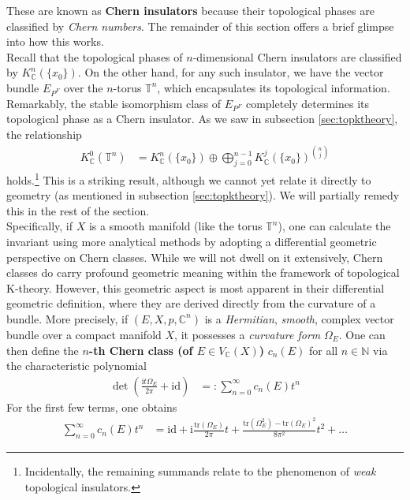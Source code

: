These are known as \textbf{Chern insulators} because their topological phases are classified by \textit{Chern numbers}.
The remainder of this section offers a brief glimpse into how this works.
\\
Recall that the topological phases of $n$-dimensional Chern insulators are classified by $K_{\mathbb{C}}^{n}(\lbrace x_{0} \rbrace)$.
On the other hand, for any such insulator, we have the vector bundle $E_{P^{F}}$ over the $n$-torus $\mathbb{T}^{n}$, which encapsulates its topological information.
Remarkably, the stable isomorphism class of $E_{P^{F}}$ completely determines its topological phase as a Chern insulator. As we saw in subsection \ref{sec:topktheory}, the relationship
\begin{align*}
  K_{\mathbb{C}}^{0}(\mathbb{T}^{n})
  &=
  K_{\mathbb{C}}^{n}(\lbrace x_{0} \rbrace)
  \oplus
  \bigoplus_{j=0}^{n-1}
  K_{\mathbb{C}}^{j}(\lbrace x_{0} \rbrace)^{\binom{n}{j}}
\end{align*}
holds.\footnote{Incidentally, the remaining summands relate to the phenomenon of \textit{weak} topological insulators.} This is a striking result, although we cannot yet relate it directly to geometry (as mentioned in subsection \ref{sec:topktheory}).
We will partially remedy this in the rest of the section.
\\
Specifically, if $X$ is a smooth manifold (like the torus $\mathbb{T}^{n}$), one can calculate the invariant using more analytical methods by adopting a differential geometric perspective on Chern classes.
While we will not dwell on it extensively, Chern classes do carry profound geometric meaning within the framework of topological K-theory.
However, this geometric aspect is most apparent in their differential geometric definition, where they are derived directly from the curvature of a bundle.
More precisely, if $(E,X,p,\mathbb{C}^{n})$ is a \textit{Hermitian}, \textit{smooth}, complex vector bundle over a compact manifold $X$, it possesses a \textit{curvature form} $\Omega_{E}$. One can then define the \textbf{$n$-th Chern class (of $E \in V_{\mathbb{C}}(X)$)} $c_{n}(E)$ for all $n \in \mathbb{N}$ via the characteristic polynomial
\begin{align*}
  \det
  \left(
    \frac{\mathrm{i}t\Omega_{E}}{2\pi}
    +
    \mathrm{id}
  \right)
  &=:
  \sum_{n=0}^{\infty}
  c_{n}(E)
  t^{n}
\end{align*}
For the first few terms, one obtains
\begin{align*}
  \sum_{n=0}^{\infty}
  c_{n}(E)
  t^{n}
  &=
  \mathrm{id}
  +
  \mathrm{i}
  \frac{\mathrm{tr}(\Omega_{E})}{2\pi}
  t
  +
  \frac{\mathrm{tr}(\Omega_{E}^{2}) - \mathrm{tr}(\Omega_{E})^{2}}{8\pi^{2}}
  t^{2}
  +
  \ldots
\end{align*}
